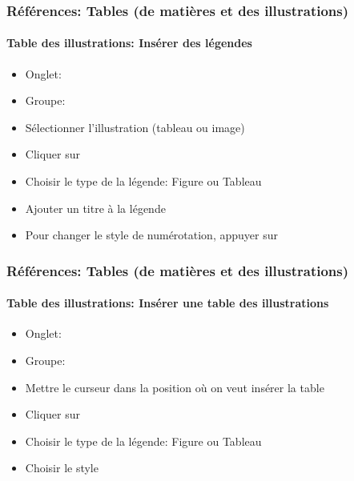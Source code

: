 \documentclass[xcolor=table]{beamer}
\begin{document}

\begin{frame}[t]
\frametitle{Références: Tables (de matières et des illustrations)}
\framesubtitle{Table des illustrations: Insérer des légendes}

\begin{minipage}{0.61\textwidth}
	\begin{itemize}
		\item Onglet: 
		\item Groupe: 
		\item Sélectionner l'illustration (tableau ou image)
		\item Cliquer sur 
		\item Choisir le type de la légende: Figure ou Tableau
		\item Ajouter un titre à la légende
		\item Pour changer le style de numérotation, appuyer sur 
	\end{itemize}
\end{minipage}
\begin{minipage}{0.38\textwidth}
	
	
\end{minipage}

\end{frame}

\begin{frame}[t]
\frametitle{Références: Tables (de matières et des illustrations)}
\framesubtitle{Table des illustrations: Insérer une table des illustrations}

\begin{minipage}{0.61\textwidth}
	\begin{itemize}
		\item Onglet: 
		\item Groupe: 
		\item Mettre le curseur dans la position où on veut insérer la table
		\item Cliquer sur 
		\item Choisir le type de la légende: Figure ou Tableau
		\item Choisir le style
	\end{itemize}
\end{minipage}
\begin{minipage}{0.38\textwidth}
	
	
\end{minipage}

\end{frame}
\end{document}
